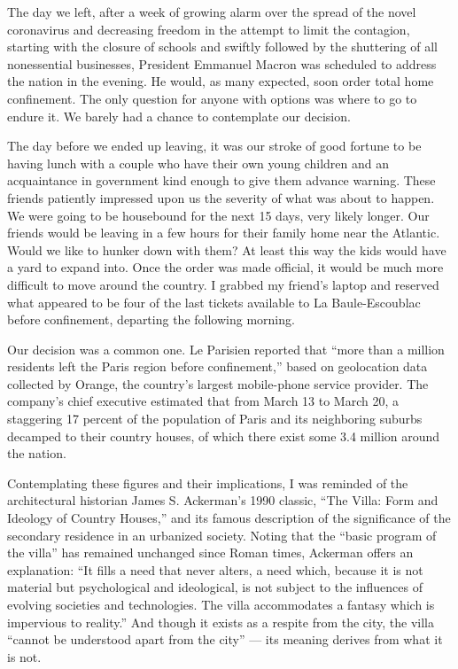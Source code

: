 The day we left, after a week of growing alarm over the spread of the
novel coronavirus and decreasing freedom in the attempt to limit the
contagion, starting with the closure of schools and swiftly followed by
the shuttering of all nonessential businesses, President Emmanuel Macron
was scheduled to address the nation in the evening. He would, as many
expected, soon order total home confinement. The only question for
anyone with options was where to go to endure it. We barely had a chance
to contemplate our decision.

The day before we ended up leaving, it was our stroke of good fortune to
be having lunch with a couple who have their own young children and an
acquaintance in government kind enough to give them advance warning.
These friends patiently impressed upon us the severity of what was about
to happen. We were going to be housebound for the next 15 days, very
likely longer. Our friends would be leaving in a few hours for their
family home near the Atlantic. Would we like to hunker down with them?
At least this way the kids would have a yard to expand into. Once the
order was made official, it would be much more difficult to move around
the country. I grabbed my friend's laptop and reserved what appeared to
be four of the last tickets available to La Baule-Escoublac before
confinement, departing the following morning.

Our decision was a common one. Le Parisien reported that ``more than a
million residents left the Paris region before confinement,'' based on
geolocation data collected by Orange, the country's largest mobile-phone
service provider. The company's chief executive estimated that from
March 13 to March 20, a staggering 17 percent of the population of Paris
and its neighboring suburbs decamped to their country houses, of which
there exist some 3.4 million around the nation.

Contemplating these figures and their implications, I was reminded of
the architectural historian James S. Ackerman's 1990 classic, ``The
Villa: Form and Ideology of Country Houses,'' and its famous description
of the significance of the secondary residence in an urbanized society.
Noting that the ``basic program of the villa'' has remained unchanged
since Roman times, Ackerman offers an explanation: ``It fills a need
that never alters, a need which, because it is not material but
psychological and ideological, is not subject to the influences of
evolving societies and technologies. The villa accommodates a fantasy
which is impervious to reality.'' And though it exists as a respite from
the city, the villa ``cannot be understood apart from the city'' --- its
meaning derives from what it is not.

